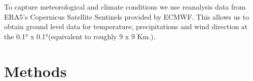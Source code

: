 \documentclass[11pt]{article}
\begin{document}
\begin{spacing}{1.3}
To capture meteorological and climate conditions we use reanalysis data from ERA5's Copernicus Satellite Sentinels provided by ECMWF. This allows us to obtain ground level data for temperature, precipitations and wind direction at the 0.1° x 0.1°(equivalent to roughly 9 x 9 Km.). %






\section{Methods}
\label{scn:methods}


\end{spacing}
\end{document}
